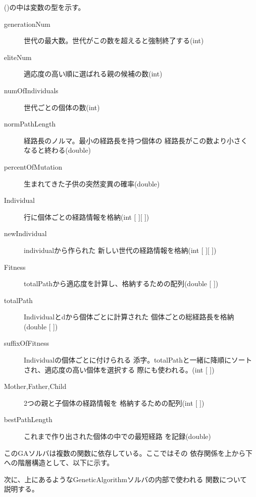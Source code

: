 \documentclass[9pt]{ltjsarticle}
\begin{document}
\begin{tcolorbox}[title=GeneticAlgorithmソルバ]
()の中は変数の型を示す。
\begin{description}
    \item[generationNum]世代の最大数。世代がこの数を超えると強制終了する(int)
    \item[eliteNum]適応度の高い順に選ばれる親の候補の数(int)
    \item[numOfIndividuals]世代ごとの個体の数(int)
    \item[normPathLength]経路長のノルマ。最小の経路長を持つ個体の
    経路長がこの数より小さくなると終わる(double)
    \item[percentOfMutation]生まれてきた子供の突然変異の確率(double)
    \item[Individual]行に個体ごとの経路情報を格納(int [ ][ ])
    \item[newIndividual]individualから作られた
    新しい世代の経路情報を格納(int [ ][ ])
    \item[Fitness]totalPathから適応度を計算し、格納するための配列(double [ ])
    \item[totalPath]Individualとdから個体ごとに計算された
    個体ごとの総経路長を格納(double [ ])
    \item[suffixOfFitness]Individualの個体ごとに付けられる
    添字。totalPathと一緒に降順にソートされ、適応度の高い個体を選択する
    際にも使われる。(int [ ])
    \item[Mother,Father,Child]2つの親と子個体の経路情報を
    格納するための配列(int [ ])
    \item[bestPathLength]これまで作り出された個体の中での最短経路
    を記録(double)
\end{description}
\end{tcolorbox}

このGAソルバは複数の関数に依存している。ここではその
依存関係を上から下への階層構造として、以下に示す。

\begin{center}
\end{center}
次に、上にあるようなGeneticAlgorithmソルバの内部で使われる
関数について説明する。
\end{document}
